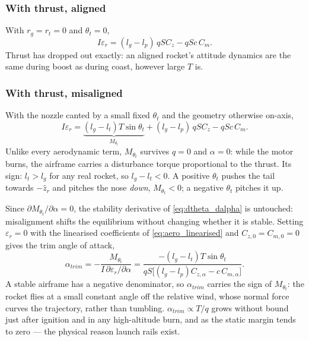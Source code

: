\subsubsection{With thrust, aligned}\label{sec:analysis_aligned}
With $r_g=r_t=0$ and $\theta_t=0$,
\begin{equation} \label{eq:moment_aligned}
    I\varepsilon_r = (l_g - l_p)\,qSC_z - qSc\,C_m.
\end{equation}
Thrust has dropped out exactly: an aligned rocket's attitude dynamics are the same during boost
as during coast, however large $T$ is.

\subsubsection{With thrust, misaligned}\label{sec:analysis_misaligned}
With the nozzle canted by a small fixed $\theta_t$ and the geometry otherwise on-axis,
\begin{equation} \label{eq:moment_misaligned}
    I\varepsilon_r = \underbrace{(l_g - l_t)T\sin\theta_t}_{M_{\theta_t}}
                     + (l_g - l_p)\,qSC_z - qSc\,C_m.
\end{equation}
Unlike every aerodynamic term, $M_{\theta_t}$ survives $q=0$ and $\alpha=0$: while the motor burns,
the airframe carries a disturbance torque proportional to the thrust. Its sign: $l_t>l_g$ for any
real rocket, so $l_g-l_t<0$. A positive $\theta_t$ pushes the tail towards $-\hat{z}_r$ and pitches
the nose \emph{down}, $M_{\theta_t}<0$; a negative $\theta_t$ pitches it up.

Since $\partial M_{\theta_t}/\partial\alpha=0$, the stability derivative of
\autoref{eq:dtheta_dalpha} is untouched: misalignment shifts the equilibrium without changing
whether it is stable. Setting $\varepsilon_r=0$ with the linearised coefficients of
\autoref{eq:aero_linearised} and $C_{z,0}=C_{m,0}=0$ gives the trim angle of attack,
\begin{equation} \label{eq:alpha_trim}
    \alpha_{trim} = -\frac{M_{\theta_t}}{I\,\partial\varepsilon_r/\partial\alpha}
        = \frac{-(l_g - l_t)T\sin\theta_t}
               {qS\bigl[(l_g - l_p)C_{z,\alpha} - c\,C_{m,\alpha}\bigr]}.
\end{equation}
A stable airframe has a negative denominator, so $\alpha_{trim}$ carries the sign of
$M_{\theta_t}$: the rocket flies at a small constant angle off the relative wind, whose normal
force curves the trajectory, rather than tumbling. $\alpha_{trim}\propto T/q$ grows without bound
just after ignition and in any high-altitude burn, and as the static margin tends to zero --- the
physical reason launch rails exist.

